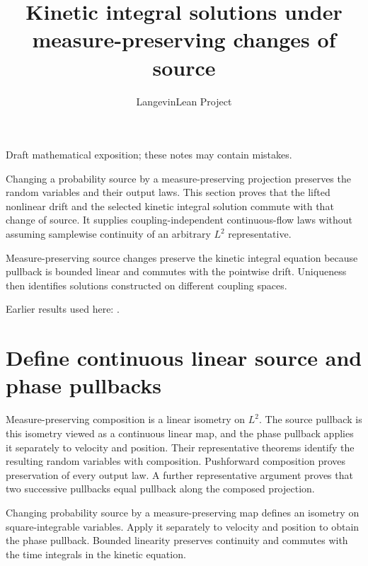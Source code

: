 \documentclass[11pt,a4paper]{article}
\title{\texorpdfstring{Kinetic integral solutions under measure-preserving changes of source}{Kinetic integral solutions under measure-preserving changes of source}}
\author{LangevinLean Project}
\date{}
\begin{document}
\maketitle
Draft mathematical exposition; these notes may contain mistakes.


Changing a probability source by a measure-preserving projection preserves the random variables and their output laws. This section proves that the lifted nonlinear drift and the selected kinetic integral solution commute with that change of source. It supplies coupling-independent continuous-flow laws without assuming samplewise continuity of an arbitrary \(L^{2}\) representative.



Measure-preserving source changes preserve the kinetic integral equation because pullback is bounded linear and commutes with the pointwise drift. Uniqueness then identifies solutions constructed on different coupling spaces.



Earlier results used here: \cite[Section~3.13]{LangevinLean2026ULASC}.

\section{\texorpdfstring{Define continuous linear source and phase pullbacks}{Define continuous linear source and phase pullbacks}}


Measure-preserving composition is a linear isometry on \(L^{2}\). The source pullback is this isometry viewed as a continuous linear map, and the phase pullback applies it separately to velocity and position. Their representative theorems identify the resulting random variables with composition. Pushforward composition proves preservation of every output law. A further representative argument proves that two successive pullbacks equal pullback along the composed projection.



Changing probability source by a measure-preserving map defines an isometry on square-integrable variables. Apply it separately to velocity and position to obtain the phase pullback. Bounded linearity preserves continuity and commutes with the time integrals in the kinetic equation.
\end{document}

